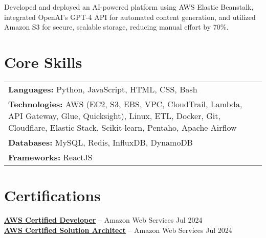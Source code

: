 \documentclass[10pt, letterpaper]{article}
\begin{document}
Developed and deployed an AI-powered platform using AWS Elastic Beanstalk, integrated OpenAI's GPT-4 API for automated content generation, and utilized Amazon S3 for secure, scalable storage, reducing manual effort by 70\%.

\vspace{0.2cm}

\section{Core Skills}
\begin{tabularx}{\textwidth}{>{\raggedright\arraybackslash}X}
\textbf{Languages:} Python, JavaScript, HTML, CSS, Bash \\
\textbf{Technologies:} AWS (EC2, S3, EBS, VPC, CloudTrail, Lambda, API Gateway, Glue, Quicksight), Linux, ETL, Docker, Git, Cloudflare, Elastic Stack, Scikit-learn, Pentaho, Apache Airflow\\
\textbf{Databases:} MySQL, Redis, InfluxDB, DynamoDB \\
\textbf{Frameworks:} ReactJS \\
\end{tabularx}

\vspace{0.2cm}



\section{Certifications}
\textbf{\href{https://cp.certmetrics.com/amazon/en/public/verify/credential/dc7c20379cf94f2699a4d430c31ac969}{AWS Certified Developer}} -- Amazon Web Services \hfill Jul 2024 \\
\textbf{\href{https://cp.certmetrics.com/amazon/en/public/verify/credential/7ec7fce4db1f4b1bab3b6f8caa3f509b}{AWS Certified Solution Architect}} -- Amazon Web Services \hfill Jul 2024
\end{document}
